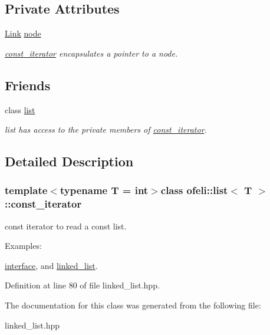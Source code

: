 \subsection*{Private Attributes}
\begin{DoxyCompactItemize}
\item 
\hypertarget{classofeli_1_1list_1_1const__iterator_a4d13eb002aeaaa460605719cd043d116}{\hyperlink{classofeli_1_1list_a7765ecb875543506d04dbd466f754503}{Link} \hyperlink{classofeli_1_1list_1_1const__iterator_a4d13eb002aeaaa460605719cd043d116}{node}}\label{classofeli_1_1list_1_1const__iterator_a4d13eb002aeaaa460605719cd043d116}

\begin{DoxyCompactList}\small\item\em {\itshape \hyperlink{classofeli_1_1list_1_1const__iterator}{const\-\_\-iterator}} encapsulates a pointer to a node. \end{DoxyCompactList}\end{DoxyCompactItemize}
\subsection*{Friends}
\begin{DoxyCompactItemize}
\item 
\hypertarget{classofeli_1_1list_1_1const__iterator_a39e8296e3b93358d0af90000b5d9113c}{class \hyperlink{classofeli_1_1list_1_1const__iterator_a39e8296e3b93358d0af90000b5d9113c}{list}}\label{classofeli_1_1list_1_1const__iterator_a39e8296e3b93358d0af90000b5d9113c}

\begin{DoxyCompactList}\small\item\em list has access to the private members of {\itshape \hyperlink{classofeli_1_1list_1_1const__iterator}{const\-\_\-iterator}}. \end{DoxyCompactList}\end{DoxyCompactItemize}


\subsection{Detailed Description}
\subsubsection*{template$<$typename T = int$>$class ofeli\-::list$<$ T $>$\-::const\-\_\-iterator}

const iterator to read a const list. \begin{Desc}
\item[Examples\-: ]\par
\hyperlink{interface-example}{interface}, and \hyperlink{linked_list-example}{linked\-\_\-list}.\end{Desc}


Definition at line 80 of file linked\-\_\-list.\-hpp.



The documentation for this class was generated from the following file\-:\begin{DoxyCompactItemize}
\item 
linked\-\_\-list.\-hpp\end{DoxyCompactItemize}
